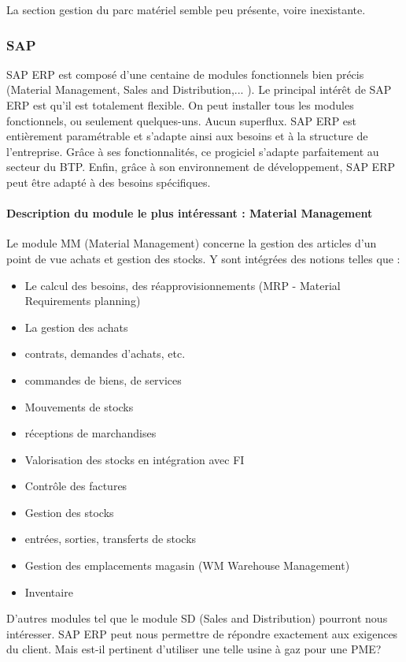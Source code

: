 La section gestion du parc matériel semble peu présente, voire inexistante.
				\subsubsection{SAP}

				SAP ERP est composé d'une centaine de modules fonctionnels bien précis (Material Management, Sales and Distribution,... ). 
Le principal intérêt de SAP ERP est qu'il est totalement flexible. On peut installer tous les modules fonctionnels, ou seulement quelques-uns. 
Aucun superflux. SAP ERP est entièrement paramétrable et s'adapte ainsi aux besoins et à la structure de l'entreprise. 
Grâce à ses fonctionnalités, ce progiciel s'adapte parfaitement au secteur du BTP. 
Enfin, grâce à son environnement de développement, SAP ERP peut être adapté à des besoins spécifiques.\\
\paragraph{Description du module le plus intéressant : Material Management}
Le module MM (Material Management) concerne la gestion des articles d'un point de vue achats et gestion des stocks.
Y sont intégrées des notions telles que :
\begin{itemize}
    \item Le calcul des besoins, des réapprovisionnements (MRP - Material Requirements planning)
    \item La gestion des achats
    \item contrats, demandes d'achats, etc.
    \item commandes de biens, de services
    \item Mouvements de stocks
    \item réceptions de marchandises
    \item Valorisation des stocks en intégration avec FI
    \item Contrôle des factures
    \item Gestion des stocks
    \item entrées, sorties, transferts de stocks
    \item Gestion des emplacements magasin (WM Warehouse Management)
    \item Inventaire
\end{itemize}

D'autres modules tel que le module SD (Sales and Distribution) pourront nous intéresser.
SAP ERP peut nous permettre de répondre exactement aux exigences du client. Mais est-il pertinent d'utiliser une telle usine à gaz pour une PME?  

